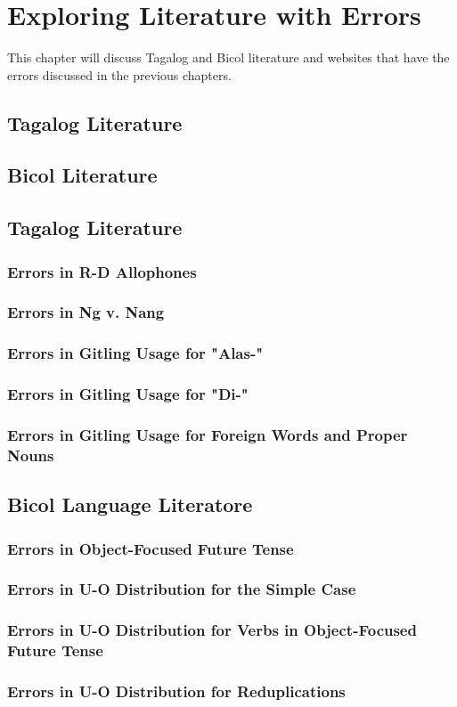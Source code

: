 \chapter{Exploring Literature with Errors}

This chapter will discuss Tagalog and Bicol literature and websites that have the errors discussed in the previous chapters.

\section{Tagalog Literature}

\section{Bicol Literature}


\section{Tagalog Literature}
\subsection{Errors in R-D Allophones}
\subsection{Errors in Ng v. Nang}
\subsection{Errors in Gitling Usage for "Alas-"}
\subsection{Errors in Gitling Usage for "Di-"}
\subsection{Errors in Gitling Usage for Foreign Words and Proper Nouns}


\section{Bicol Language Literatore}
\subsection{Errors in Object-Focused Future Tense}
\subsection{Errors in U-O Distribution for the Simple Case}
\subsection{Errors in U-O Distribution for Verbs in Object-Focused Future Tense}
\subsection{Errors in U-O Distribution for Reduplications}